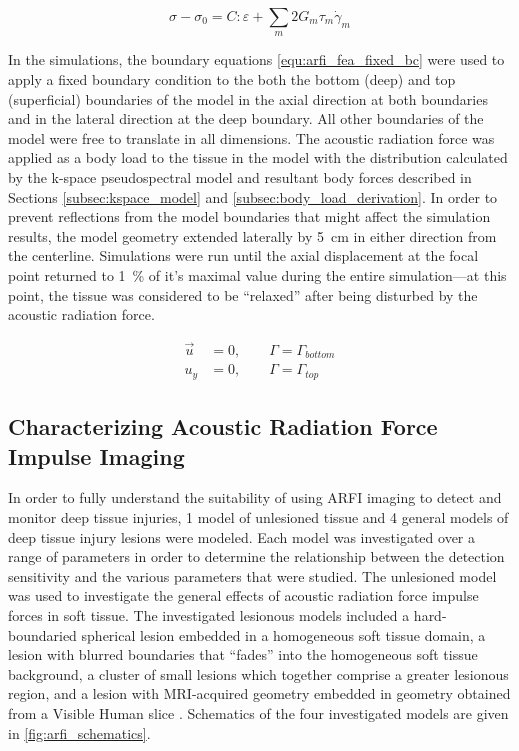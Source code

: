 			\begin{equation}
				\label{fea:time_deformation_visco}
				\sigma - \sigma_0 = C : \varepsilon + \sum_m 2 G_m \tau_m \dot{\gamma}_m 
			\end{equation}

			In the simulations, the boundary equations \ref{equ:arfi_fea_fixed_bc} were used to apply a fixed boundary condition to the both the bottom (deep) and top (superficial) boundaries of the model in the axial direction at both boundaries and in the lateral direction at the deep boundary. All other boundaries of the model were free to translate in all dimensions. The acoustic radiation force was applied as a body load to the tissue in the model with the distribution calculated by the k-space pseudospectral model and resultant body forces described in Sections \ref{subsec:kspace_model} and \ref{subsec:body_load_derivation}. In order to prevent reflections from the model boundaries that might affect the simulation results, the model geometry extended laterally by \SI{5}{\cm} in either direction from the centerline. Simulations were run until the axial displacement at the focal point returned to \SI{1}{\percent} of it's maximal value during the entire simulation---at this point, the tissue was considered to be ``relaxed'' after being disturbed by the acoustic radiation force.

			\begin{subequations}
				\label{equ:arfi_fea_fixed_bc}
				\begin{align}
					\vec{u} &= 0, \qquad \Gamma = \Gamma_{bottom} \\
					u_y &= 0, \qquad \Gamma = \Gamma_{top}
				\end{align}
			\end{subequations}

		\FloatBarrier
		\subsection{Characterizing Acoustic Radiation Force Impulse Imaging}
			In order to fully understand the suitability of using ARFI imaging to detect and monitor deep tissue injuries, 1 model of unlesioned tissue and 4 general models of deep tissue injury lesions were modeled. Each model was investigated over a range of parameters in order to determine the relationship between the detection sensitivity and the various parameters that were studied. The unlesioned model was used to investigate the general effects of acoustic radiation force impulse forces in soft tissue. The investigated lesionous models included a hard-boundaried spherical lesion embedded in a homogeneous soft tissue domain, a lesion with blurred boundaries that ``fades'' into the homogeneous soft tissue background, a cluster of small lesions which together comprise a greater lesionous region, and a lesion with MRI-acquired geometry \cite{solis13} embedded in geometry obtained from a Visible Human slice \cite{visiblehuman}. Schematics of the four investigated models are given in \ref{fig:arfi_schematics}.

